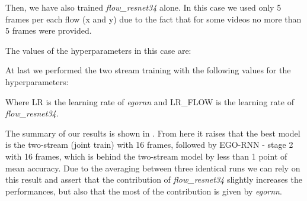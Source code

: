 \documentclass[10pt,twocolumn,hidelinks,letterpaper]{article}
\begin{document}
Then, we have also trained \textit{flow\_resnet34} alone. In this case we used only 5 frames per each flow (x and y) due to the fact that for some videos no more than 5 frames were provided.

The values of the hyperparameters in this case are:

\begin{center}
\end{center}

At last we performed the two stream training with the following values for the hyperparameters:

\begin{center}
\end{center}

Where LR is the learning rate of \textit{egornn} and LR\_FLOW is the learning rate of \textit{flow\_resnet34}.

The summary of our results is shown in .  From here it raises that the best model is the two-stream (joint train) with 16 frames, followed by EGO-RNN - stage 2 with 16 frames, which is behind the two-stream model by less than 1 point of mean accuracy. Due to the averaging between three identical runs we can rely on this result and assert that the contribution of \textit{flow\_resnet34} slightly increases the performances, but also that the most of the contribution is given by \textit{egornn}.
\end{document}
